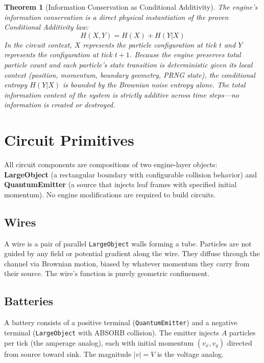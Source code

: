 \documentclass[11pt,a4paper]{article}
\newtheorem{theorem}{Theorem}[section]
\begin{document}
\begin{theorem}[Information Conservation as Conditional Additivity]
\label{thm:conservation}
The engine's information conservation is a direct physical instantiation of the proven Conditional Additivity law:
\begin{equation}
    H(X,Y) = H(X) + H(Y|X)
\end{equation}
In the circuit context, $X$ represents the particle configuration at tick $t$ and $Y$ represents the configuration at tick $t+1$. Because the engine preserves total particle count and each particle's state transition is deterministic given its local context (position, momentum, boundary geometry, PRNG state), the conditional entropy $H(Y|X)$ is bounded by the Brownian noise entropy alone. The total information content of the system is strictly additive across time steps---no information is created or destroyed.
\end{theorem}


\section{Circuit Primitives}
\label{sec:primitives}

All circuit components are compositions of two engine-layer objects: \textbf{LargeObject} (a rectangular boundary with configurable collision behavior) and \textbf{QuantumEmitter} (a source that injects leaf frames with specified initial momentum). No engine modifications are required to build circuits.

\subsection{Wires}

A wire is a pair of parallel \texttt{LargeObject} walls forming a tube. Particles are not guided by any field or potential gradient along the wire. They diffuse through the channel via Brownian motion, biased by whatever momentum they carry from their source. The wire's function is purely geometric confinement.

\subsection{Batteries}

A battery consists of a positive terminal (\texttt{QuantumEmitter}) and a negative terminal (\texttt{LargeObject} with ABSORB collision). The emitter injects $A$ particles per tick (the amperage analog), each with initial momentum $(v_x, v_y)$ directed from source toward sink. The magnitude $|v| = V$ is the voltage analog.
\end{document}
